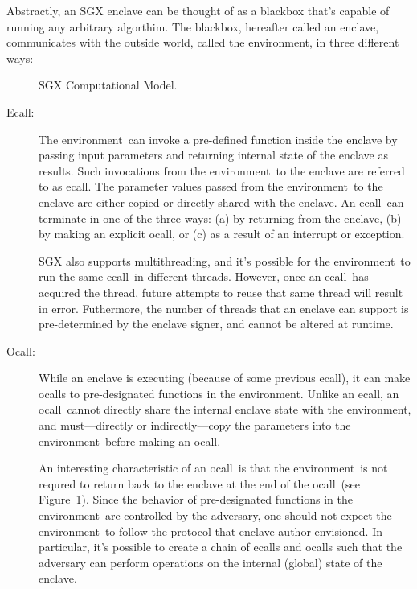 \documentclass[10pt]{article}
\newcommand{\ecall}{\textsf{ecall}}
\newcommand{\ocall}{\textsf{ocall}}
\newcommand{\env}{\textsf{environment}}
\begin{document}
  Abstractly, an SGX enclave can be thought of as a blackbox that's
  capable of running any arbitrary algorthim. The blackbox, hereafter
  called an enclave, communicates with the outside world, called the
  \env, in three different ways:

  \begin{figure}[h]
  \centering
  
  \caption{SGX Computational Model.}
  \label{fig:model}
  \end{figure}

  \begin{description}
  \item[Ecall:] The \env\ can invoke a pre-defined function inside the
    enclave by passing input parameters and returning internal state
    of the enclave as results. Such invocations from the \env\ to the
    enclave are referred to as \ecall. The parameter values passed
    from the \env\ to the enclave are either copied or directly shared
    with the enclave. An \ecall\ can terminate in one of the three
    ways: (a) by returning from the enclave, (b) by making an explicit
    \ocall, or (c) as a result of an interrupt or exception.

    SGX also supports multithreading, and it's possible for the
    \env\ to run the same \ecall\ in different threads. However, once
    an \ecall\ has acquired the thread, future attempts to reuse that
    same thread will result in error. Futhermore, the number of
    threads that an enclave can support is pre-determined by the
    enclave signer, and cannot be altered at runtime.

  \item [Ocall:] While an enclave is executing (because of some
    previous \ecall), it can make \ocall s to pre-designated functions
    in the \env.  Unlike an \ecall, an \ocall\ cannot directly share
    the internal enclave state with the \env, and must---directly or
    indirectly---copy the parameters into the \env\ before making an
    \ocall.

    An interesting characteristic of an \ocall\ is that the \env\ is
    not requred to return back to the enclave at the end of the
    \ocall\ (see Figure~\ref{fig:model}). Since the behavior of
    pre-designated functions in the \env\ are controlled by the
    adversary, one should not expect the \env\ to follow the protocol
    that enclave author envisioned. In particular, it's possible to
    create a chain of \ecall s and \ocall s such that the adversary
    can perform operations on the internal (global) state of the
    enclave.


\end{description}
\end{document}
